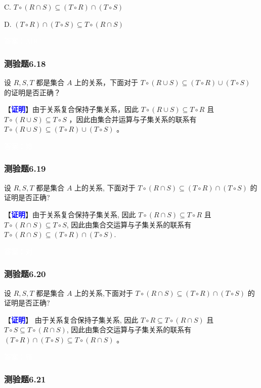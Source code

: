 \documentclass[UTF8, heading=true]{ctexart}
\begin{document}
C. $T \circ (R \cap S) \subseteq (T \circ R) \cap (T \circ S)$

D. $(T \circ R) \cap (T \circ S) \subseteq T \circ (R \cap S)$


\textcolor{white}{答案：ABC}

\subsubsection{测验题6.18}

设 $R, S, T$ 都是集合 $A$ 上的关系，下面对于 $T \circ(R \cup S) \subseteq(T \circ R) \cup(T \circ S)$ 的证明是否正确？

【\textbf{\textcolor{blue}{证明}}】由于关系复合保持子集关系，因此 $T \circ(R \cup S) \subseteq T \circ R$ 且 $T \circ(R \cup S) \subseteq T \circ S$ ，因此由集合并运算与子集关系的联系有 $T \circ(R \cup S) \subseteq(T \circ R) \cup(T \circ S)$ 。

\textcolor{white}{答案：错}

\subsubsection{测验题6.19}

设 $R, S, T$ 都是集合 $A$ 上的关系, 下面对于 $T \circ(R \cap S) \subseteq(T \circ R) \cap(T \circ S)$ 的证明是否正确?

【\textcolor{blue}{\textbf{证明}}】由于关系复合保持子集关系, 因此 $T \circ(R \cap S) \subseteq T \circ R$ 且 $T \circ(R \cap S) \subseteq T \circ S$, 因此由集合交运算与子集关系的联系有 $T \circ(R \cap S) \subseteq(T \circ R) \cap(T \circ S)$.

\textcolor{white}{答案：对}

\subsubsection{测验题6.20}
设 $R, S, T$ 都是集合 $A$ 上的关系,下面对于 $T \circ(R \cap S) \subseteq(T \circ R) \cap(T \circ S)$ 的证明是否正确?

【\textcolor{blue}{\textbf{证明}}】 由于关系复合保持子集关系, 因此 $T \circ R \subseteq T \circ(R \cap S)$ 且 $T \circ S \subseteq T \circ(R \cap S)$, 因此由集合交运算与子集关系的联系有 $(T \circ R) \cap(T \circ S) \subseteq T \circ(R \cap S)$ 。

\textcolor{white}{答案：错}

\subsubsection{测验题6.21}
\end{document}
